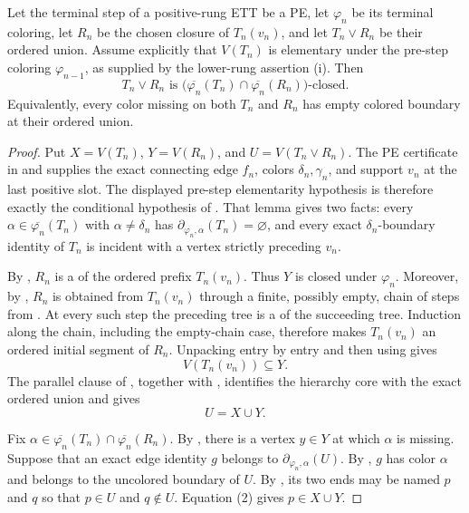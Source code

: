 \begin{lemma}
Let the terminal step of a positive-rung ETT be a PE, let
$\varphi_n$ be its terminal coloring, let $R_n$ be the chosen closure of
$T_n(v_n)$, and let $T_n\vee R_n$ be their ordered union.  Assume
explicitly that $V(T_n)$ is elementary under the pre-step coloring
$\varphi_{n-1}$, as supplied by the lower-rung assertion (i).  Then
\[
 T_n\vee R_n\text{ is }
 \bigl(\overline{\varphi_n}(T_n)\cap
       \overline{\varphi_n}(R_n)\bigr)\text{-closed}.
\]
Equivalently, every color missing on both $T_n$ and $R_n$ has empty
colored boundary at their ordered union.
\end{lemma}
\begin{proof}
Put $X=V(T_n)$, $Y=V(R_n)$, and $U=V(T_n\vee R_n)$.
The PE certificate in  and
 supplies the exact connecting edge
$f_n$, colors $\delta_n,\gamma_n$, and support $v_n$ at the last
positive slot.  The displayed pre-step elementarity hypothesis is
therefore exactly the conditional hypothesis of
.  That lemma gives two facts:
every $\alpha\in\overline{\varphi_n}(T_n)$ with
$\alpha\ne\delta_n$ has
$\partial_{\varphi_n,\alpha}(T_n)=\varnothing$, and every exact
$\delta_n$-boundary identity of $T_n$ is incident with a vertex strictly
preceding $v_n$.

By , $R_n$ is a
 of the ordered prefix $T_n(v_n)$.
Thus $Y$ is closed under $\varphi_n$.  Moreover, by
, $R_n$ is obtained from
$T_n(v_n)$ through a finite, possibly empty, chain of steps from
.  At every such step the preceding tree
is a  of the succeeding tree.
Induction along the chain, including the empty-chain case, therefore makes
$T_n(v_n)$ an ordered initial segment of $R_n$.  Unpacking
 entry by entry and then using
 gives
\[
             V(T_n(v_n))\subseteq Y.                              \tag{1}
\]
The parallel clause of , together with
, identifies the hierarchy core with the exact
ordered union and gives
\[
             U=X\cup Y.                                           \tag{2}
\]

Fix
$\alpha\in\overline{\varphi_n}(T_n)\cap
\overline{\varphi_n}(R_n)$.  By , there is
a vertex $y\in Y$ at which $\alpha$ is missing.  Suppose that an exact
edge identity $g$ belongs to
$\partial_{\varphi_n,\alpha}(U)$.  By
, $g$ has color $\alpha$ and belongs to the
uncolored boundary of $U$.  By , its two ends may
be named $p$ and $q$ so that $p\in U$ and $q\notin U$.  Equation (2)
gives $p\in X\cup Y$.


\end{proof}
